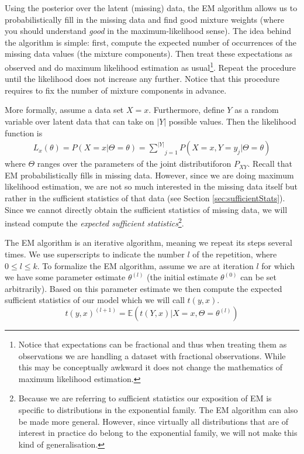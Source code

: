\documentclass[a4paper,11pt,leqno]{report}\usepackage[]{graphicx}\usepackage[]{color}
\newcommand{\E}{\mathbb{E}}
\begin{document}
Using the posterior over the latent (missing) data, the EM algorithm allows us to probabilistically fill in the missing data and find good mixture weights
(where you should understand \textit{good} in the maximum-likelihood sense). The idea behind the
algorithm is simple: first, compute the expected number of occurrences of the missing data values (the mixture 
components). Then treat these expectations as observed and do maximum likelihood estimation as usual\footnote{Notice that expectations can be
fractional and thus when treating them as observations we are handling a dataset with fractional observations. While this may be conceptually awkward
it does not change the mathematics of maximum likelihood estimation.}. Repeat the procedure 
until the likelihood does not increase any further. Notice that this procedure requires to
fix the number of mixture components in advance.

More formally, assume a data set $ X=x $. Furthermore, define $ Y $ as a random variable over latent data that can
take on $ |Y| $ possible values. Then the likelihood function is 
\begin{align}
L_{x}(\theta) = P(X=x|\Theta=\theta) = \underset{j=1}{\overset{|Y|}{\sum}} P(X=x, Y=y_{j}|\Theta=\theta)
\end{align}
where $ \Theta $ ranges over the parameters of the joint distributiforon $ P_{XY} $. Recall that EM
probabilistically fills in missing data. However, since we are doing maximum likelihood estimation, we
are not so much interested in the missing data itself but rather in the sufficient statistics of
that data (see Section \ref{sec:sufficientStats}). Since we cannot directly obtain the sufficient statistics
of missing data, we will instead compute the \textit{expected sufficient statistics}\footnote{
Because we are referring to sufficient statistics our exposition of EM is specific to distributions
in the exponential family. The EM algorithm can also be made more general. However, since virtually
all distributions that are of interest in practice do belong to the exponential family, we will not make this kind of generalisation.
}.

The EM algorithm is an iterative 
algorithm, meaning we repeat its steps several
times. We use superscripts to indicate the number $l$ of the repetition, where $ 0 \leq l \leq k $.
To formalize the EM algorithm, assume we are at iteration $l$ for which we have some parameter estimate 
$\theta^{(l)} $ (the initial estimate $\theta^{(0)}$ can be set arbitrarily). Based on this parameter 
estimate we then compute the expected sufficient statistics of our model which we will call $ t(y,x) $.
\begin{equation} \label{Estep}
t(y,x)^{(l+1)} = \E(t(Y,x)|X = x,\Theta = \theta^{(l)})
\end{equation} 
\end{document}
